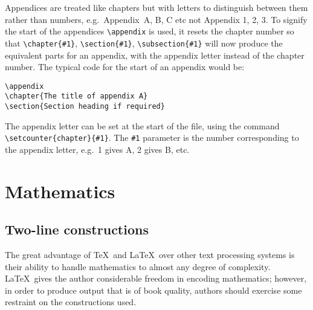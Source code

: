 Appendices are treated like chapters but with letters to distinguish 
between them rather than numbers, e.g.\ Appendix~A, B, C etc not Appendix
1, 2, 3. To signify the start of the appendices 
\verb"\appendix" is used, it  resets
the chapter number so that \verb"\chapter{#1}",
\verb"\section{#1}", \verb"\subsection{#1}" will now produce the
equivalent parts for an appendix, with the appendix letter instead of the
chapter number.   The typical code
for the start of an appendix  would be:
\begin{verbatim}
\appendix
\chapter{The title of appendix A}
\section{Section heading if required}
\end{verbatim}

The appendix letter can be set at the start 
of the file, using the command \verb"\setcounter{chapter}{#1}". 
The \verb"#1" parameter is  
the number corresponding to the appendix letter, e.g.\ 1 gives A, 2
gives B, etc. 


\chapter{Mathematics}
\section{Two-line constructions}
The great advantage of \TeX\ and \LaTeX\ 
over other text processing systems is their
ability to handle 
mathematics to almost any degree of complexity. 
\LaTeX\ gives the author considerable freedom in encoding 
mathematics; however, in order to produce output that is of book 
quality, authors should exercise some restraint on the constructions 
used.

